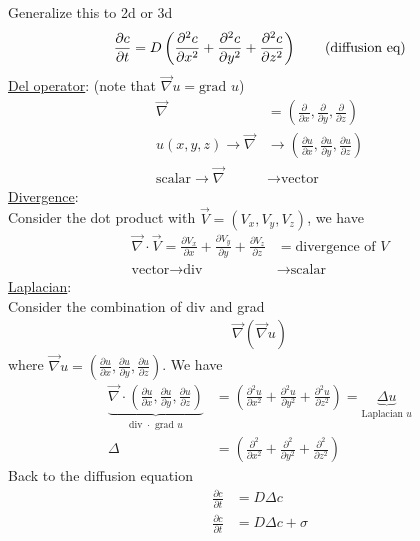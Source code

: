\documentclass[12pt, letterpaper]{article}
\begin{document}
Generalize this to 2d or 3d 
\begin{align*}
    \frac{\partial c}{\partial t} = D \left(\frac{\partial^2 c}{\partial x^2} + \frac{\partial^2 c}{\partial y^2} + \frac{\partial^2 c}{\partial z^2}\right) \tag{\text{diffusion eq}}
\end{align*}
\underline{Del operator}: (note that $\vec{\nabla} u = \text{grad } u$)
\begin{align*}
    \vec{\nabla} &= \left( \frac{\partial}{\partial x} , \frac{\partial}{\partial y} , \frac{\partial}{\partial z} \right) \\
    u(x,y,z) \rightarrow \vec{\nabla} &\rightarrow \left( \frac{\partial u}{\partial x} , \frac{\partial u}{\partial y} , \frac{\partial u}{\partial z} \right) \\
    \text{scalar} \rightarrow \vec{\nabla} &\rightarrow \text{vector}
\end{align*}
\underline{Divergence}: \\
Consider the dot product with $\vec{V} = (V_x, V_y, V_z)$, we have
\begin{align*}
    \vec{\nabla} \cdot \vec{V} = \frac{\partial V_x}{\partial x} + \frac{\partial V_y}{\partial y} + \frac{\partial V_z}{\partial z} &= \text{divergence of } V \\
    \text{vector} \rightarrow \text{div} &\rightarrow \text{scalar}
\end{align*}
\underline{Laplacian}: \\
Consider the combination of div and grad
\begin{align*}
    \vec \nabla ( \vec \nabla u)
\end{align*}
where $\vec \nabla u = \left( \frac{\partial u}{\partial x} , \frac{\partial u}{\partial y} , \frac{\partial u}{\partial z} \right)$. We have
\begin{align*}
    \underbrace{\vec \nabla \cdot \left( \frac{\partial u}{\partial x} , \frac{\partial u}{\partial y} , \frac{\partial u}{\partial z} \right)}_{\text{div }\cdot\text{ grad } u} &= \left( \frac{\partial^2 u}{\partial x^2} + \frac{\partial^2 u}{\partial y^2} + \frac{\partial^2 u}{\partial z^2} \right) = \underbrace{\Delta u}_{\text{Laplacian }u} \\
    \Delta &= \left( \frac{\partial^2 }{\partial x^2} + \frac{\partial^2 }{\partial y^2} + \frac{\partial^2}{\partial z^2} \right)
\end{align*}
Back to the diffusion equation
\begin{align*}
    \frac{\partial c}{\partial t} &= D\Delta c \tag{diffusion eq} \\
    \frac{\partial c}{\partial t} &= D\Delta c + \sigma \tag{reaction-diffusion eq}
\end{align*}
\end{document}
